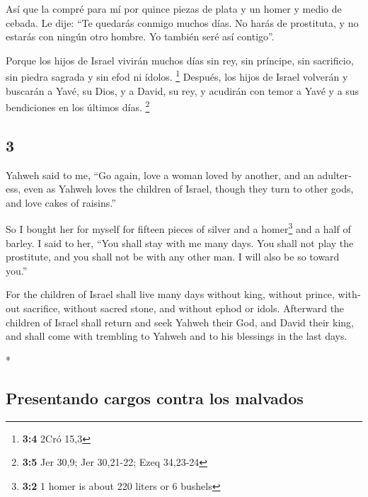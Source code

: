 \begin{paracol}{2}
 Así que la compré para mí por quince piezas de plata y un
homer y medio de cebada.  Le dije: ``Te quedarás conmigo
muchos días. No harás de prostituta, y no estarás con ningún otro
hombre. Yo también seré así contigo''.

 Porque los hijos de Israel vivirán muchos días sin rey,
sin príncipe, sin sacrificio, sin piedra sagrada y sin efod ni ídolos.
\footnote{\textbf{3:4} 2Cró 15,3}  Después, los hijos de
Israel volverán y buscarán a Yavé, su Dios, y a David, su rey, y
acudirán con temor a Yavé y a sus bendiciones en los últimos días.
\footnote{\textbf{3:5} Jer 30,9; Jer 30,21-22; Ezeq 34,23-24}

\switchcolumn
\begin{otherlanguage}{english}

\hypertarget{section-5}{%
\section{3}\label{section-5}}

 Yahweh said to me, ``Go again, love a woman loved by
another, and an adulteress, even as Yahweh loves the children of Israel,
though they turn to other gods, and love cakes of raisins.''

 So I bought her for myself for fifteen pieces of silver
and a homer\footnote{\textbf{3:2} 1 homer is about 220 liters or 6
  bushels} and a half of barley.  I said to her, ``You
shall stay with me many days. You shall not play the prostitute, and you
shall not be with any other man. I will also be so toward you.''

 For the children of Israel shall live many days without
king, without prince, without sacrifice, without sacred stone, and
without ephod or idols.  Afterward the children of Israel
shall return and seek Yahweh their God, and David their king, and shall
come with trembling to Yahweh and to his blessings in the last days.

\end{otherlanguage}

\switchcolumn[0]*

\hypertarget{presentando-cargos-contra-los-malvados}{%
\subsection{Presentando cargos contra los
malvados}\label{presentando-cargos-contra-los-malvados}}


\end{paracol}
